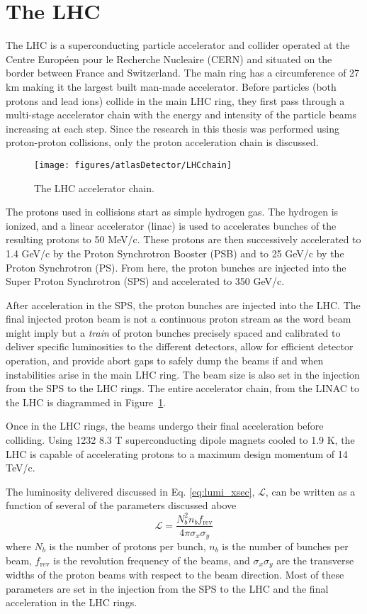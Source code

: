 \section{The LHC}
The LHC is a superconducting particle accelerator and collider operated at the Centre Europ\'{e}en pour le Recherche Nucleaire (CERN) and situated on the border between France and Switzerland\cite{LHC}. The main ring has a circumference of 27 km making it the largest built man-made accelerator. Before particles (both protons and lead ions) collide in the main LHC ring, they first pass through a multi-stage accelerator chain with the energy and intensity of the particle beams increasing at each step. Since the research in this thesis was performed using proton-proton collisions, only the proton acceleration chain is discussed.
\begin{figure}[h!]
\centering
\label{fig:LHCchain}
\texttt{[image: figures/atlasDetector/LHCchain]}
\caption{The LHC accelerator chain.}
\end{figure}
The protons used in collisions start as simple hydrogen gas. The hydrogen is ionized, and a linear accelerator (linac) is used to accelerates bunches of the resulting protons to 50 MeV/c. These protons are then successively accelerated to 1.4 GeV/c by the Proton Synchrotron Booster (PSB) and to 25 GeV/c by the Proton Synchrotron (PS). From here, the proton bunches are injected into the Super Proton Synchrotron (SPS) and accelerated to 350 GeV/c. 

After acceleration in the SPS, the proton bunches are injected into the LHC. The final injected proton beam is not a continuous proton stream as the word beam might imply but a \textit{train} of proton bunches precisely spaced and calibrated to deliver specific luminosities to the different detectors, allow for efficient detector operation, and provide abort gaps to safely dump the beams if and when instabilities arise in the main LHC ring. The beam size is also set in the injection from the SPS to the LHC rings. The entire accelerator chain, from the LINAC to the LHC is diagrammed in Figure~\ref{fig:LHCchain}.

Once in the LHC rings, the beams undergo their final acceleration before colliding. Using 1232 8.3 T superconducting dipole magnets cooled to 1.9 K, the LHC is capable of accelerating protons to a maximum design momentum of 14 TeV/c.

The luminosity delivered discussed in Eq. \ref{eq:lumi_xsec}, $\mathcal{L}$, can be written as a function of several of the parameters discussed above\begin{equation}
\label{eq:lumi_full}
  \mathcal{L} = \frac{N_b^2 n_b f_{\text{rev}} } {4\pi \sigma_x \sigma_y}
\end{equation}
where $N_b$ is the number of protons per bunch, $n_b$ is the number of bunches per beam, $f_{\text{rev}}$ is the revolution frequency of the beams, and $\sigma_x \sigma_y$ are the transverse widths of the proton beams with respect to the beam direction. Most of these parameters are set in the injection from the SPS to the LHC and the final acceleration in the LHC rings. 

